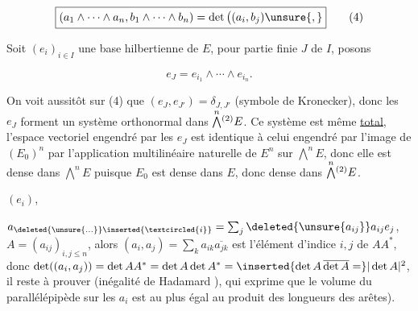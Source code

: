 \[
\boxed{(a_1\wedge\cdots\wedge a_n,b_1\wedge\cdots\wedge b_n)=\det\big((a_i,b_j)\unsure{,}\big.} \tag*{(4)}
\]

Soit $(e_i)_{i\in I}$ une base hilbertienne  de  $E$, pour  partie
finie   $J$ de $I$, posons

\[
\boxed{e_J=e_{i_1}\wedge\cdots\wedge e_{i_n}}. \tag*{(5)}
\]

 On voit aussitôt sur (4) que
$(e_J,e_{J'})=\delta_{J,J'}$ (symbole de Kronecker), donc les
$e_J$ forment un système orthonormal dans $\overset{n}{\bigwedge}\vphantom{\bigwedge}^{(2)}E$. Ce système
est  même \uline{total},   l'espace vectoriel engendré
par les $e_J$  est identique à celui engendré par l'image
de $(E_0)^n$ par l'application multilinéaire naturelle de $E^n$
 sur $\overset{n}{\bigwedge}E$, donc elle est dense dans $\overset{n}{\bigwedge}E$ puisque
$E_0$ est dense dans $E$, donc dense dans $\overset{n}{\bigwedge}\vphantom{\bigwedge}^{(2)}E$.


 $(e_i)$, 

  $a_{\deleted{\unsure{\ldots}}\inserted{\textcircled{i}}}=\sum_j\deleted{\unsure{a_{ij}}}a_{ij}e_j$,
 $A=(a_{ij})_{i,j\leq n}$, alors $(a_i,a_j)=\sum_k a_{ik}\overline{a_{jk}}$
est l'élément d'indice $i,j$ de  $AA^*$, donc
$\det((a_i,a_j))=\det AA^*=\det A\det A^*=\inserted{\det A\,\overline{\det A}=}|\det A|^2$,  il
reste à prouver  (inégalité
de Hadamard ), qui exprime que le volume du
parallélépipède  sur les $a_i$ est au plus
égal au produit des longueurs des arêtes).


